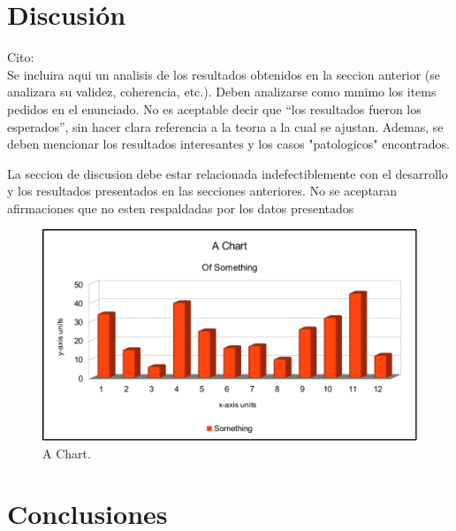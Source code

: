 \documentclass[double, 1.5in, 12pt]{beavtex}
\begin{document}

\chapter{Discusi\'on}

Cito: \\

Se incluira aqui un analisis de los resultados obtenidos en la seccion anterior (se analizara
su validez, coherencia, etc.). Deben analizarse como mınimo los items pedidos en el
enunciado. No es aceptable decir que “los resultados fueron los esperados”, sin hacer
clara referencia a la teorıa a la cual se ajustan. Ademas, se deben mencionar los resultados interesantes y los casos "patologicos" encontrados.

La seccion de discusion debe estar relacionada indefectiblemente con el desarrollo y los
resultados presentados en las secciones anteriores. No se aceptaran afirmaciones que no esten
respaldadas por los datos presentados


\pagebreak[4]

\begin{figure}
\begin{center}
	\includegraphics[width=14cm]{chart.pdf}
	\caption{A Chart.}
	\label{fig:chart}
	\end{center}
\end{figure}

\pagebreak[4]





\chapter{Conclusiones}
\end{document}
